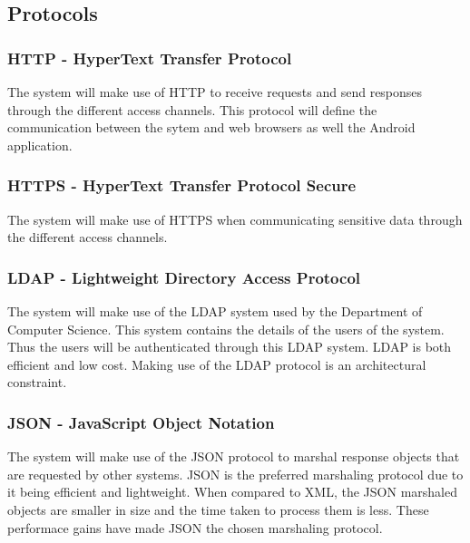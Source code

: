 \topmargin=-0.45in
\evensidemargin=0in
\oddsidemargin=0in
\textwidth=6.5in
\textheight=9.0in
\headsep=0.25in

\linespread{1.1} %

\subsection{Protocols}

\subsubsection{HTTP - HyperText Transfer Protocol}

The system will make use of HTTP to receive requests and send responses through the different access channels. This protocol will define the communication
between the sytem and web browsers as well the Android application.

\subsubsection{HTTPS - HyperText Transfer Protocol Secure}

The system will make use of HTTPS when communicating sensitive data through the different access channels.

\subsubsection{LDAP - Lightweight Directory Access Protocol}

The system will make use of the LDAP system used by the Department of Computer Science. This system contains the details of the users of the system.
Thus the users will be authenticated through this LDAP system. LDAP is both efficient and low cost. Making use of the LDAP protocol is an architectural constraint. 

\subsubsection{JSON - JavaScript Object Notation}

The system will make use of the JSON protocol to marshal response objects that are requested by other systems. JSON is the preferred
marshaling protocol due to it being efficient and lightweight. When compared to XML, the JSON marshaled objects are smaller in size
and the time taken to process them is less. These performace gains have made JSON the chosen marshaling protocol.

